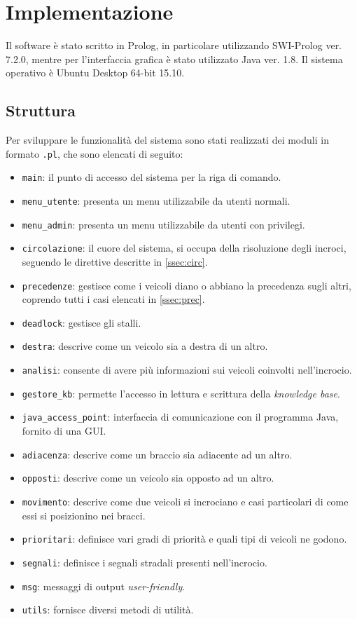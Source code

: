 \chapter{Implementazione}

Il software è stato scritto in Prolog, in particolare utilizzando SWI-Prolog ver. 7.2.0, mentre per l'interfaccia grafica è stato utilizzato Java ver. 1.8. Il sistema operativo è Ubuntu Desktop 64-bit 15.10.

\section{Struttura}
Per sviluppare le funzionalità del sistema sono stati realizzati dei moduli in formato \texttt{.pl}, che sono elencati di seguito:
\begin{itemize}
\item \texttt{main}: il punto di accesso del sistema per la riga di comando.
\item \texttt{menu\_utente}: presenta un menu utilizzabile da utenti normali.
\item \texttt{menu\_admin}: presenta un menu utilizzabile da utenti con privilegi.
\item \texttt{circolazione}: il cuore del sistema, si occupa della risoluzione degli incroci, seguendo le direttive descritte in \ref{ssec:circ}.
\item \texttt{precedenze}: gestisce come i veicoli diano o abbiano la precedenza sugli altri, coprendo tutti i casi elencati in \ref{ssec:prec}.
\item \texttt{deadlock}: gestisce gli stalli.
\item \texttt{destra}: descrive come un veicolo sia a destra di un altro.
\item \texttt{analisi}: consente di avere più informazioni sui veicoli coinvolti nell'incrocio.
\item \texttt{gestore\_kb}: permette l'accesso in lettura e scrittura della \emph{knowledge base}.
\item \texttt{java\_access\_point}: interfaccia di comunicazione con il programma Java, fornito di una GUI.
\item \texttt{adiacenza}: descrive come un braccio sia adiacente ad un altro.
\item \texttt{opposti}: descrive come un veicolo sia opposto ad un altro.
\item \texttt{movimento}: descrive come due veicoli si incrociano e casi particolari di come essi si posizionino nei bracci.
\item \texttt{prioritari}: definisce vari gradi di priorità e quali tipi di veicoli ne godono.
\item \texttt{segnali}: definisce i segnali stradali presenti nell'incrocio.
\item \texttt{msg}: messaggi di output \emph{user-friendly}.
\item \texttt{utils}: fornisce diversi metodi di utilità.
\end{itemize}

